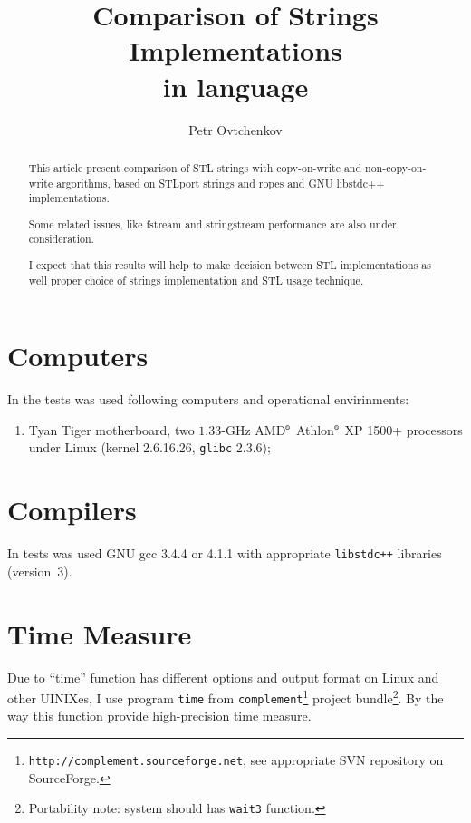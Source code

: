 \documentclass[a4paper]{article}
\title{Comparison of Strings Implementations \\ in \CPP{} language}
\author{Petr Ovtchenkov}
\providecommand{\STLport}{{\fontfamily{cmss}\selectfont STLport}}
\providecommand{\libstd}{{\fontfamily{cmtt}\selectfont GNU \mbox{libstdc++}}}
\begin{document}
\maketitle

\begin{abstract}
This article present comparison of STL strings with copy-on-write and
non-copy-on-write argorithms, based on \STLport{} strings and ropes
and \libstd{} implementations.

Some related issues, like fstream and stringstream performance
are also under consideration.

I expect that this results will help to make decision between
STL implementations as well proper choice of strings implementation
and STL usage technique.
\end{abstract}

\tableofcontents

\section{Computers}

In the tests was used following computers and operational envirinments:
\begin{enumerate}
  \item Tyan Tiger motherboard, two $1.33$-GHz
        AMD$^{\mbox{\tiny\textregistered}}$ Athlon$^{\mbox{\tiny\textregistered}}$ XP 1500+ processors under Linux (kernel 2.6.16.26, \verb|glibc| 2{.}3{.}6);\label{AMD}
\end{enumerate}

\section{Compilers}

In tests was used GNU gcc 3{.}4{.}4 or 4{.}1{.}1
with appropriate
\verb|libstdc++| libraries (version~3).

\section{Time Measure\label{timemeasure}}

Due to ``time'' function has different options and output format on Linux
and other UINIXes, I use program \texttt{time} from
\texttt{complement}\footnote{\texttt{http://complement.sourceforge.net}, see appropriate SVN repository on SourceForge.}
project bundle\footnote{Portability note: system should has \texttt{wait3} function.}.
By the way this function provide high-precision time measure.
\end{document}
